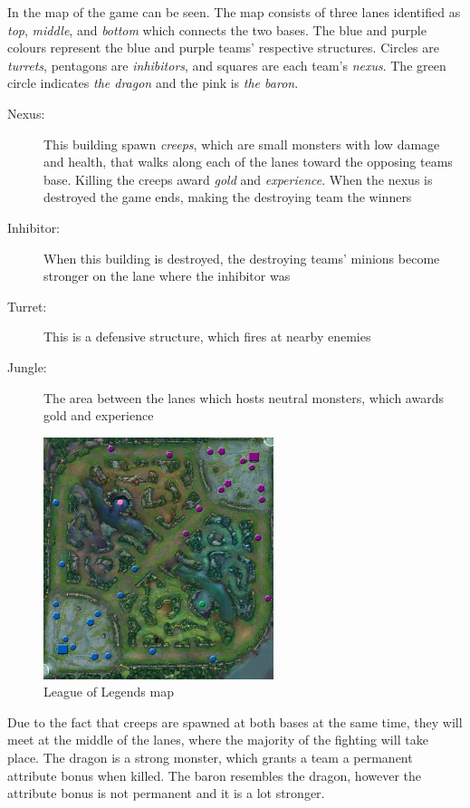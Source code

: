 In  the map of the game can be seen. The map consists of three lanes identified as \emph{top}, \emph{middle}, and \emph{bottom} which connects the two bases. The blue and purple colours represent the blue and purple teams' respective structures. Circles are \emph{turrets}, pentagons are \emph{inhibitors}, and squares are each team's \emph{nexus}. The green circle indicates \emph{the dragon} and the pink is \emph{the baron}.

\begin{description}
\item[Nexus:] This building spawn \emph{creeps}, which are small monsters with low damage and health, that walks along each of the lanes toward the opposing teams base. Killing the creeps award \emph{gold} and \emph{experience}. When the nexus is destroyed the game ends, making the destroying team the winners
\item[Inhibitor:] When this building is destroyed, the destroying teams' minions become stronger on the lane where the inhibitor was
\item[Turret:] This is a defensive structure, which fires at nearby enemies
\item[Jungle:] The area between the lanes which hosts neutral monsters, which awards gold and experience
\end{description}

\begin{figure}[!htb]
  \centering
    \includegraphics[width=0.6\textwidth]{img/lolmap.jpg}
  \caption{League of Legends map~\cite{lolmap}}\label{fig:lolmap}
\end{figure}

Due to the fact that creeps are spawned at both bases at the same time, they will meet at the middle of the lanes, where the majority of the fighting will take place. The dragon is a strong monster, which grants a team a permanent attribute bonus when killed. The baron resembles the dragon, however the attribute bonus is not permanent and it is a lot stronger.

